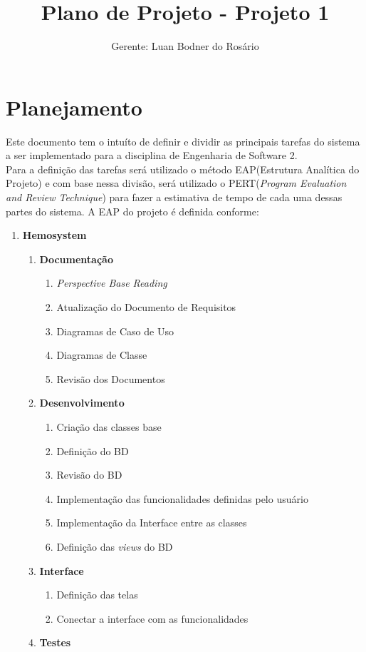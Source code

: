 \documentclass[12pt,a4paper,final]{report}
\author{Gerente: Luan Bodner do Rosário}
\title{Plano de Projeto - Projeto 1}
\begin{document}
\maketitle
\section*{Planejamento}

Este documento tem o intuíto de definir e dividir as principais tarefas do sistema a ser implementado para a disciplina de Engenharia de Software 2.\\
Para a definição das tarefas será utilizado o método EAP(Estrutura Analítica do Projeto) e com base nessa divisão, será utilizado o PERT(\textit{Program Evaluation and Review Technique}) para fazer a estimativa de tempo de cada uma dessas partes do sistema.
A EAP do projeto é definida conforme:

\begin{enumerate}
\item \textbf{Hemosystem}
\begin{enumerate}[label*=\arabic*.]
\item \textbf{Documentação}
\begin{enumerate}[label*=\arabic*.]
\item \textit{Perspective Base Reading}
\item Atualização do Documento de Requisitos
\item Diagramas de Caso de Uso
\item Diagramas de Classe
\item Revisão dos Documentos
\end{enumerate}
\item \textbf{Desenvolvimento}
\begin{enumerate}[label*=\arabic*.]
\item Criação das classes base
\item Definição do BD
\item Revisão do BD
\item Implementação das funcionalidades definidas pelo usuário
\item Implementação da Interface entre as classes
\item Definição das \textit{views} do BD
\end{enumerate}
\item \textbf{Interface}
\begin{enumerate}[label*=\arabic*.]
\item Definição das telas
\item Conectar a interface com as funcionalidades
\end{enumerate}
\item \textbf{Testes}

\end{enumerate}
\end{enumerate}
\end{document}

